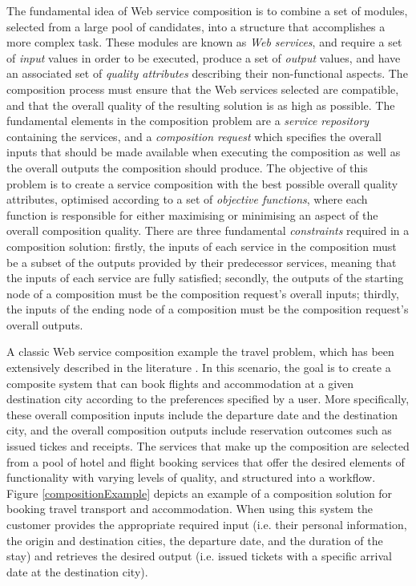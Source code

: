 \documentclass{llncs}
\begin{document}
The fundamental idea of Web service composition is to combine a set of modules, selected from a large pool of candidates, into a structure that accomplishes a more complex task. These modules are known as \textit{Web services}, and require a set of \textit{input} values in order to be executed, produce a set of \textit{output} values, and have an associated set of \textit{quality attributes} describing their non-functional aspects. The composition process must ensure that the Web services selected are compatible, and that the overall quality of the resulting solution is as high as possible. The fundamental elements in the composition problem are a \textit{service repository} containing the services, and a \textit{composition request} which specifies the overall inputs that should be made available when executing the composition as well as the overall outputs the composition should produce. The objective of this problem is to create a service composition with the best possible overall quality attributes, optimised according to a set of \textit{objective functions}, where each function is responsible for either maximising or minimising an aspect of the overall composition quality. There are three fundamental \textit{constraints} required in a composition solution: firstly, the inputs of each service in the composition must be a subset of the outputs provided by their predecessor services, meaning that the inputs of each service are fully satisfied; secondly, the outputs of the starting node of a composition must be the composition request’s overall inputs; thirdly, the inputs of the ending node of a composition must be the composition request’s overall outputs.

A classic Web service composition example the travel problem, which has been extensively described in the literature \cite{srivastava2003web,tang2010hybrid,sheng2014web}. In this scenario, the goal is to create a composite system that can book flights and accommodation at a given destination city according to the preferences specified by a user. More specifically, these overall composition inputs include the departure date and the destination city, and the overall composition outputs include reservation outcomes such as issued tickes and receipts. The services that make up the composition are selected from a pool of hotel and flight booking services that offer the desired elements of functionality with varying levels of quality, and structured into a workflow. Figure \ref{compositionExample} depicts an example of a composition solution for booking travel transport and accommodation. When using this system the customer provides the appropriate required input (i.e. their personal information, the origin and destination cities, the departure date, and the duration of the stay) and retrieves the desired output (i.e. issued tickets with a specific arrival date at the destination city).
\end{document}
